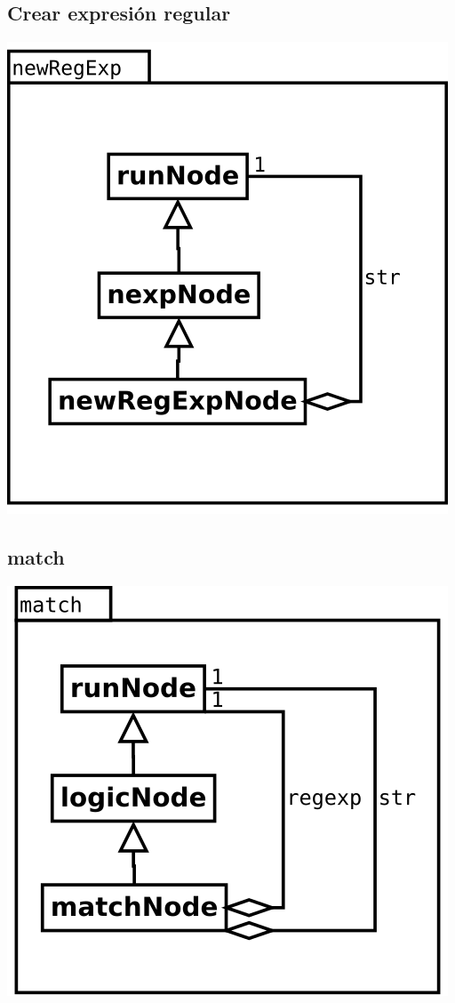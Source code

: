\subsection {Crear expresión regular}
\begin{center}
\includegraphics[scale=0.4]{newRegExp.png} \\
\end{center}

\subsection {match}
\begin{center}
\includegraphics[scale=0.4]{match.png} \\
\end{center}

